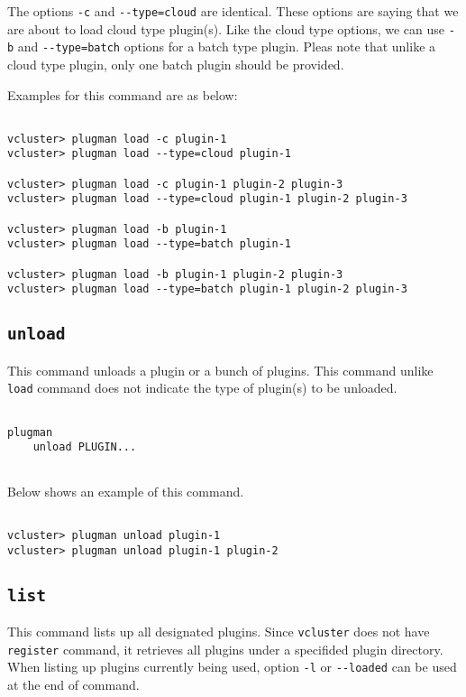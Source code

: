 \documentclass[11pt]{article}
\def \ttt{\texttt}
\def \vb{\verb}
\begin{document}
The options \vb+-c+ and \vb+--type=cloud+ are identical. These options are saying that we are about to load cloud type plugin(s). Like the cloud type options, we can use \vb+-b+ and \vb+--type=batch+ options for a batch type plugin. Pleas note that unlike a cloud type plugin, only one batch plugin should be provided.

Examples for this command are as below:


\begin{Verbatim}[fontfamily=courier, fontsize = \small, obeytabs
=true, tabsize=4, frame=lines]

vcluster> plugman load -c plugin-1
vcluster> plugman load --type=cloud plugin-1

vcluster> plugman load -c plugin-1 plugin-2 plugin-3
vcluster> plugman load --type=cloud plugin-1 plugin-2 plugin-3

vcluster> plugman load -b plugin-1
vcluster> plugman load --type=batch plugin-1

vcluster> plugman load -b plugin-1 plugin-2 plugin-3
vcluster> plugman load --type=batch plugin-1 plugin-2 plugin-3

\end{Verbatim}



\subsection{\ttt{unload}}
This command unloads a plugin or a bunch of plugins. This command unlike \vb+load+ command does not indicate the type of plugin(s) to be unloaded.

\begin{Verbatim}[fontfamily=courier, fontsize = \small, obeytabs
=true, tabsize=4, frame=lines]

plugman 
    unload PLUGIN...
      
\end{Verbatim}

Below shows an example of this command.

\begin{Verbatim}[fontfamily=courier, fontsize = \small, obeytabs
=true, tabsize=4, frame=lines]

vcluster> plugman unload plugin-1
vcluster> plugman unload plugin-1 plugin-2

\end{Verbatim}




\subsection{\ttt{list}}
This command lists up all designated plugins. Since \vb+vcluster+ does not have \vb+register+ command, it retrieves all plugins under a specifided plugin directory. When listing up plugins currently being used, option \vb+-l+ or \vb+--loaded+ can be used at the end of command.
\end{document}
